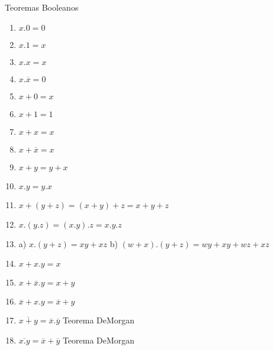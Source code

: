 \noindent Teoremas Booleanos

\begin{enumerate}[(1)]
\item $x.0=0$
\item $x.1=x$
\item $x.x=x$
\item $x.\overline{x}=0$
\item $x+0=x$
\item $x+1=1$
\item $x+x=x$
\item $x+\overline{x}=x$
\item $x+y=y+x$
\item $x.y=y.x$
\item $x+(y+z)=(x+y)+z=x+y+z$
\item $x.(y.z)=(x.y).z=x.y.z$
\item a) $x.(y+z)=xy+xz$  \hfil b) $(w+x).(y+z)=wy+xy+wz+xz$
\item $x+x.y=x$
\item $x+\overline{x}.y=x+y$
\item $\overline{x}+x.y=\overline{x}+y$
\item $\overline{x+y}=\overline{x} . \overline{y}$ \hfill Teorema DeMorgan
\item $\overline{x.y}=\overline{x} + \overline{y}$ \hfill Teorema DeMorgan
\end{enumerate}